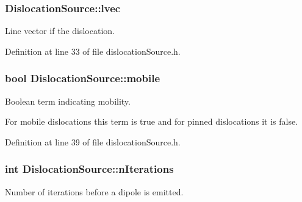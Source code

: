 \hypertarget{classDislocationSource_a6a1ab6dc549236d2335a200e601781ea}{
\subsubsection[{lvec}]{ {\bf \-Dislocation\-Source\-::lvec}}}\label{de/de3/classDislocationSource_a6a1ab6dc549236d2335a200e601781ea}


\-Line vector if the dislocation. 



\-Definition at line 33 of file dislocation\-Source.\-h.

\hypertarget{classDislocationSource_a7cfb4fd64ac4da8c79398b6e2c732875}{
\subsubsection[{mobile}]{\setlength{\rightskip}{0pt plus 5cm}bool {\bf \-Dislocation\-Source\-::mobile}}}\label{de/de3/classDislocationSource_a7cfb4fd64ac4da8c79398b6e2c732875}


\-Boolean term indicating mobility. 

\-For mobile dislocations this term is true and for pinned dislocations it is false. 

\-Definition at line 39 of file dislocation\-Source.\-h.

\hypertarget{classDislocationSource_aacf42c7505f28b50280b23b435024e17}{
\subsubsection[{n\-Iterations}]{\setlength{\rightskip}{0pt plus 5cm}int {\bf \-Dislocation\-Source\-::n\-Iterations}}}\label{de/de3/classDislocationSource_aacf42c7505f28b50280b23b435024e17}


\-Number of iterations before a dipole is emitted. 


